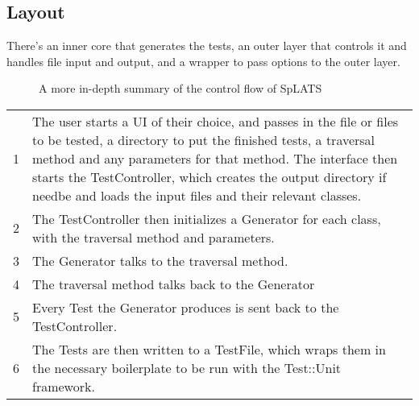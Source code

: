   \subsection{Layout}
    There's an inner core that generates the tests, an outer layer that controls it and handles file input and output, and a wrapper to pass options to the outer layer.

  \begin{center}
  \begin{figure}
  
  \caption{A more in-depth summary of the control flow of SpLATS}
  \end{figure}
  \end{center}

  \begin{tabular}{c  p{}}
  1 &
  The user starts a UI of their choice, and passes in the file or files to be tested, a directory to put the finished tests, a traversal method and any parameters for that method.
  The interface then starts the TestController, which creates the output directory if needbe and loads the input files and their relevant classes. \\
  2 &
  The TestController then initializes a Generator for each class, with the traversal method and parameters. \\
  3 &
  The Generator talks to the traversal method. \\
  4 &
  The traversal method talks back to the Generator \\
  5 &
  Every Test the Generator produces is sent back to the TestController. \\
  6 &
  The Tests are then written to a TestFile, which wraps them in the necessary boilerplate to be run with the Test::Unit framework.
  \\
  \end{tabular}

